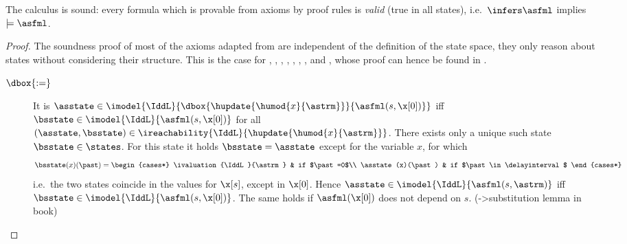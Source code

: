     \begin{theorem}\label{thm:ddL-soundness}
        The \ddL calculus is sound: every formula which is provable from \ddL axioms by \ddL proof rules is \emph{valid} (true in all states), i.e.\ $\infers\asfml$ implies $\models\asfml$.
    \end{theorem}
    \begin{proof}
        The soundness proof of most of the axioms adapted from \dL are independent of the definition of the state space, they only reason about states without considering their structure.
        This is the case for , %
        , , , , , ,  and , whose proof can hence be found in \cite{Platzer12Complete}.


    \begin{description}
        \item[$\dbox{:=}$]
        It is $\asstate\in\imodel{\IddL}{\dbox{\hupdate{\humod{x}{\astrm}}}{\asfml(s,\x[0])}}$ iff $\bsstate\in\imodel{\IddL}{\asfml(s,\x[0])}$ for all $(\asstate,\bsstate)\in\ireachability{\IddL}{\hupdate{\humod{x}{\astrm}}}$. There exists only a unique such state $\bsstate\in\states$. For this state it holds $\bsstate=\asstate$ except for the variable $x$, for which
        \begin{equation*}
            \bsstate(x)(\past) = \begin{cases*}
                    \ivaluation{\IddL}{\astrm} & if $\past=0$\\
                    \asstate(x)(\past) & if $\past\in\delayinterval$
                \end{cases*}
        \end{equation*}
        i.e.\ the two states coincide in the values for $\x[s]$, except in $\x[0]$. Hence $\asstate\in\imodel{\IddL}{\asfml(s,\astrm)}$ iff $\bsstate\in\imodel{\IddL}{\asfml(s,\x[0])}$.
        The same holds if $\asfml(\x[0])$ does not depend on $s$.
         (->substitution lemma in book)
        

\end{description}
\end{proof}
